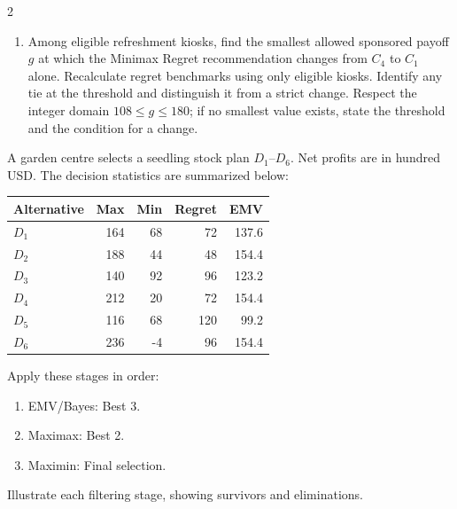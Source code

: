 \begin{multicols}{2}
\begin{enumerate}[label=\textbf{(\alph*)},leftmargin=*]
	\item Among eligible refreshment kiosks, find the smallest allowed sponsored payoff $g$ at which the Minimax Regret recommendation changes from $C_4$ to $C_1$ alone. Recalculate regret benchmarks using only eligible kiosks. Identify any tie at the threshold and distinguish it from a strict change. Respect the integer domain $108\leq g\leq180$; if no smallest value exists, state the threshold and the condition for a change. 
\end{enumerate}


\columnbreak
{}
A garden centre selects a seedling stock plan $D_1$--$D_6$. Net profits are in hundred USD. The decision statistics are summarized below:

\vspace{-3mm}
\begin{center}\small\setlength{\tabcolsep}{4pt}
	\begin{tabular}{lrrrr}\toprule
		Alternative & Max & Min & Regret & EMV\\ \midrule
		$D_1$ & 164 & 68 & 72 & 137.6\\
		$D_2$ & 188 & 44 & 48 & 154.4\\
		$D_3$ & 140 & 92 & 96 & 123.2\\
		$D_4$ & 212 & 20 & 72 & 154.4\\
		$D_5$ & 116 & 68 & 120 & 99.2\\
		$D_6$ & 236 & -4 & 96 & 154.4\\
		\bottomrule
	\end{tabular}
\end{center}
\vspace{-3mm}

Apply these stages in order:
\begin{enumerate}[leftmargin=*]
	\item EMV/Bayes: Best 3.
	\item Maximax: Best 2.
	\item Maximin: Final selection.
\end{enumerate}
Illustrate each filtering stage, showing survivors and eliminations.


\end{multicols}
\newpage
